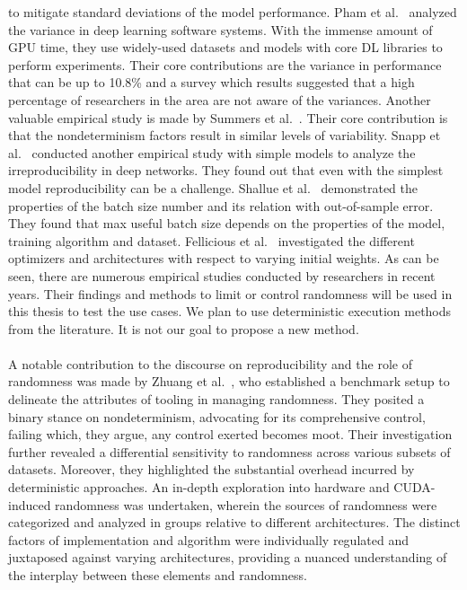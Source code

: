 to mitigate standard deviations of the model performance.
Pham et al.~\cite{pham2020problems} analyzed the variance in deep learning software systems. With the immense amount of GPU time,
they use widely-used datasets and models with core DL libraries to perform experiments. Their core contributions are the variance in performance that can be up to 10.8\% and a survey which results suggested that a high percentage of researchers in the area
are not aware of the variances. 
Another valuable empirical study is made by Summers et al.~\cite{summers2021nondeterminism}. Their core contribution is that the nondeterminism factors
result in similar levels of variability.
Snapp et al.~\cite{snapp2021synthesizing} conducted another empirical study with simple models to analyze the irreproducibility in deep networks.
They found out that even with the simplest model reproducibility can be a challenge.
Shallue et al.~\cite{shallue2018measuring} demonstrated the properties of the batch size number and its relation with out-of-sample error. They found that max useful batch size depends on 
the properties of the model, training algorithm and dataset. 
Fellicious et al.~\cite{fellicious2020effects} investigated the different optimizers and architectures with respect to varying initial weights.
As can be seen, there are numerous empirical studies conducted by researchers in recent years.
Their findings and methods to limit or control randomness will be used in this thesis to test the use cases. 
We plan to use deterministic execution methods from the literature. It is not our goal to propose a new method. 
\\
\\
A notable contribution to the discourse on reproducibility and the role of randomness was made by Zhuang et al.~\cite{zhuang2022randomness}, who established a benchmark setup to delineate the attributes of tooling in managing randomness. They posited a binary stance on nondeterminism, advocating for its comprehensive control, failing which, they argue, any control exerted becomes moot. Their investigation further revealed a differential sensitivity to randomness across various subsets of datasets. Moreover, they highlighted the substantial overhead incurred by deterministic approaches. An in-depth exploration into hardware and CUDA-induced randomness was undertaken, wherein the sources of randomness were categorized and analyzed in groups relative to different architectures. The distinct factors of implementation and algorithm were individually regulated and juxtaposed against varying architectures, providing a nuanced understanding of the interplay between these elements and randomness.
